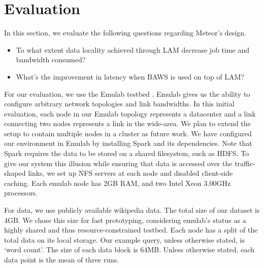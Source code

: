 \section{Evaluation}
\label{sec: eval}

In this section, we evaluate the following questions regarding Meteor's design.

\begin{itemize}

\item To what extent data locality achieved through LAM decrease job time and bandwidth consumed?
\item What's the improvement in latency when BAWS is used on top of LAM?

\end{itemize}

For our evaluation, we use the Emulab testbed \cite{emulab}. Emulab gives us the ability to configure arbitrary network topologies and link bandwidths. In this initial evaluation, each node in our Emulab topology represents a datacenter and a link connecting two nodes represents a link in the wide-area. 
We plan to extend the setup to contain multiple nodes in a cluster as future work.  We have configured our environment in Emulab by installing Spark and its dependencies. Note that Spark requires the data to be stored on a shared filesystem, such as HDFS. To give our system this illusion while ensuring that data is accessed over the traffic-shaped links, we set up NFS servers at each node and disabled client-side caching. Each emulab node has 2GB RAM, and two Intel Xeon 3.00GHz processors.

For data, we use publicly available wikipedia data. The total size of our dataset is 4GB. We chose this size for fast prototyping, considering emulab's status as a highly shared and thus resource-constrained testbed. 
Each node has a split of the total data on its local storage. Our example query, unless otherwise stated, is 
`word count'. The size of each data block is 64MB. Unless otherwise stated, each data point is the mean of three runs.

